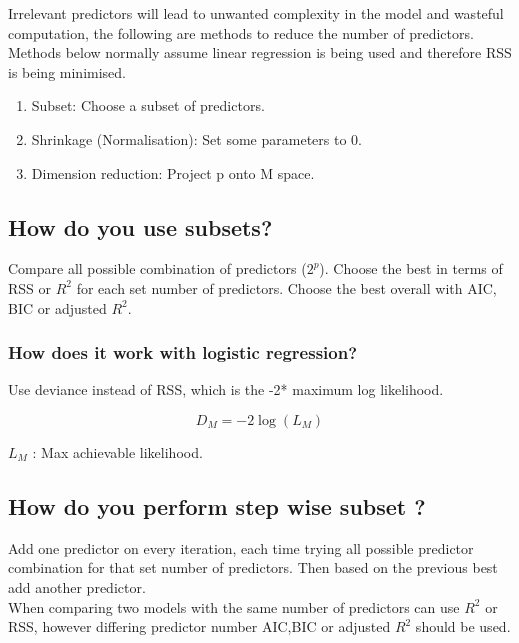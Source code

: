 \documentclass[11pt]{scrartcl} %
\begin{document}
Irrelevant predictors will lead to unwanted complexity in the model and wasteful computation, the following are methods
to reduce the number of predictors.\\

Methods below normally assume linear regression is being used and therefore RSS is being minimised.

\begin{enumerate}
	\item Subset: Choose a subset of predictors.
	\item Shrinkage (Normalisation): Set some parameters to 0.
	\item Dimension reduction: Project p onto M space.
\end{enumerate}

\subsection{How do you use subsets?}

Compare all possible combination of predictors (\(2^p\)). 
Choose the best in terms of RSS or \(R^2\) for each set number of predictors.
Choose the best overall with AIC, BIC or adjusted \(R^2\).

\subsubsection{How does it work with logistic regression?}

Use deviance instead of RSS, which is the -2* maximum log likelihood.

\begin{equation}
	D_{M} = -2 \log (L_M)
\end{equation}

\(L_M\) : Max achievable likelihood.

\subsection{How do you perform step wise subset ?}

Add one predictor on every iteration, each time trying all possible predictor combination for that
set number of predictors. Then based on the previous best add another predictor. \\

When comparing two models with the same number of predictors can use \(R^2\) or RSS, however differing
predictor number AIC,BIC or adjusted \(R^2\) should be used.
\end{document}
